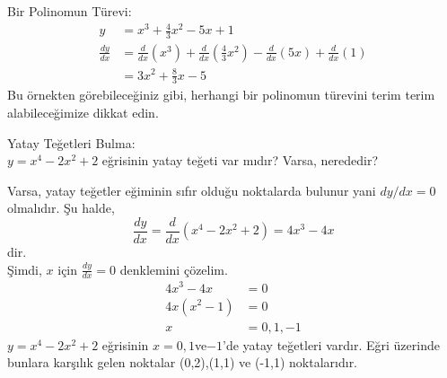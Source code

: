 \begin{ornek} Bir Polinomun Türevi:
	\begin{equation*}
	\begin{split}
		y&=x^3+\frac{4}{3}x^2-5x+1 \\
		\frac{dy}{dx}&=\frac{d}{dx}\left(x^3\right)+\frac{d}{dx}\left(\frac{4}{3}x^2\right)-\frac{d}{dx}\left(5x\right)+\frac{d}{dx}\left(1\right)\\
		&=3x^2+\frac{8}{3}x-5
	\end{split}
	\end{equation*}
Bu örnekten görebileceğiniz gibi, herhangi bir polinomun türevini terim terim alabileceğimize dikkat edin.
\end{ornek}
\begin{ornek}Yatay Teğetleri Bulma:\\
$y=x^4 - 2x^2+2$ eğrisinin yatay teğeti var mıdır? Varsa, nerededir?
\end{ornek}
\begin{cozum}
	Varsa, yatay teğetler eğiminin sıfır olduğu noktalarda bulunur yani $dy/dx = 0$ olmalıdır. Şu halde,
	\begin{equation*}
		\frac{dy}{dx}=\frac{d}{dx}(x^4-2x^2+2)=4x^3-4x
	\end{equation*}dir.\\
Şimdi, $x$ için $\frac{dy}{dx}=0$ denklemini çözelim.
	\begin{equation*}
	\begin{split}
	4x^3-4x&=0\\
	4x(x^2-1)&=0\\
	x&=0,1,-1
	\end{split}
	\end{equation*}
$y=x^4 - 2x^2+2$ eğrisinin $x=0,1$ve$-1$'de yatay teğetleri vardır. Eğri üzerinde bunlara karşılık gelen noktalar (0,2),(1,1) ve (-1,1) noktalarıdır.
\end{cozum}

